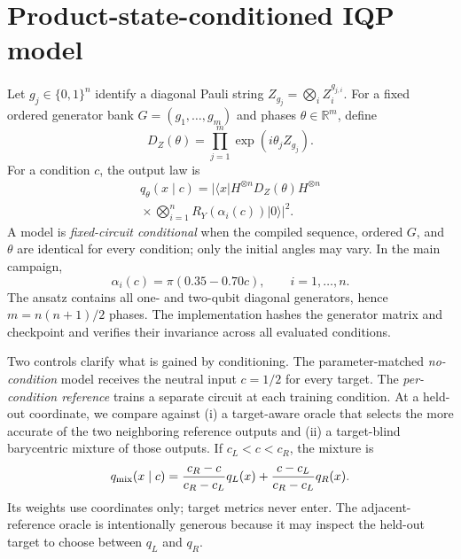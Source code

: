 \documentclass[a4paper,twocolumn,11pt,unpublished]{quantumarticle}
\newcommand{\bits}{\{0,1\}}
\begin{document}
\section{Product-state-conditioned IQP model}
\label{sec:model}

Let $g_j\in\bits^n$ identify a diagonal Pauli string
$Z_{g_j}=\bigotimes_iZ_i^{g_{j,i}}$.  For a fixed ordered generator bank
$G=(g_1,\ldots,g_m)$ and phases $\theta\in\mathbb R^m$, define
\begin{equation}
 D_Z(\theta)=\prod_{j=1}^{m}\exp(i\theta_jZ_{g_j}).
\end{equation}
For a condition $c$, the output law is
\begin{equation}
 \begin{split}
 q_\theta(x\mid c)=\bigg|\langle x|H^{\otimes n}D_Z(\theta)H^{\otimes n}\\
 {}\times\bigotimes_{i=1}^{n}R_Y(\alpha_i(c))|0\rangle\bigg|^2.
 \end{split}
 \label{eq:model}
\end{equation}
A model is \emph{fixed-circuit conditional} when the compiled sequence,
ordered $G$, and $\theta$ are identical for every condition; only the initial
angles may vary.  In the main campaign,
\begin{equation}
 \alpha_i(c)=\pi(0.35-0.70c),\qquad i=1,\ldots,n.
 \label{eq:broadcast}
\end{equation}
The ansatz contains all one- and two-qubit diagonal generators, hence
$m=n(n+1)/2$ phases.  The implementation hashes the generator matrix and
checkpoint and verifies their invariance across all evaluated conditions.

Two controls clarify what is gained by conditioning.  The parameter-matched
\emph{no-condition} model receives the neutral input $c=1/2$ for every target.
The \emph{per-condition reference} trains a separate circuit at each training
condition.  At a held-out coordinate, we compare against (i) a
target-aware oracle that selects the more accurate of the two neighboring
reference outputs and (ii) a target-blind barycentric mixture of those
outputs.  If $c_L<c<c_R$, the mixture is
\begin{equation}
 q_{\rm mix}(x\mid c)=\frac{c_R-c}{c_R-c_L}q_L(x)
 +\frac{c-c_L}{c_R-c_L}q_R(x).
 \label{eq:mixture}
\end{equation}
Its weights use coordinates only; target metrics never enter.  The
adjacent-reference oracle is intentionally generous because it may inspect the
held-out target to choose between $q_L$ and $q_R$.
\end{document}
